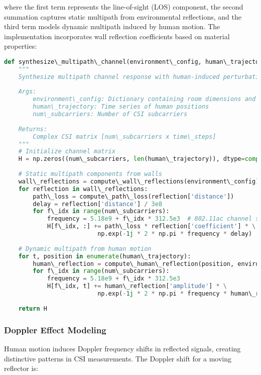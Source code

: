 \documentclass[journal]{IEEEtran}
\begin{document}
where the first term represents the line-of-sight (LOS) component, the second summation captures static multipath from environmental reflections, and the third term models dynamic multipath induced by human motion. The implementation incorporates wall reflection coefficients based on material properties:

\begin{lstlisting}[language=Python, caption=Multipath Channel Synthesis]
def synthesize\_multipath\_channel(environment\_config, human\_trajectory, num\_subcarriers=114):
    """
    Synthesize multipath channel response with human-induced perturbations
    
    Args:
        environment\_config: Dictionary containing room dimensions and materials
        human\_trajectory: Time series of human positions
        num\_subcarriers: Number of CSI subcarriers
    
    Returns:
        Complex CSI matrix [num\_subcarriers x time\_steps]
    """
    # Initialize channel matrix
    H = np.zeros((num\_subcarriers, len(human\_trajectory)), dtype=complex)
    
    # Static multipath components from walls
    wall\_reflections = compute\_wall\_reflections(environment\_config)
    for reflection in wall\_reflections:
        path\_loss = compute\_path\_loss(reflection['distance'])
        delay = reflection['distance'] / 3e8
        for f\_idx in range(num\_subcarriers):
            frequency = 5.18e9 + f\_idx * 312.5e3  # 802.11ac channel spacing
            H[f\_idx, :] += path\_loss * reflection['coefficient'] * \
                          np.exp(-1j * 2 * np.pi * frequency * delay)
    
    # Dynamic multipath from human motion
    for t, position in enumerate(human\_trajectory):
        human\_reflection = compute\_human\_reflection(position, environment\_config)
        for f\_idx in range(num\_subcarriers):
            frequency = 5.18e9 + f\_idx * 312.5e3
            H[f\_idx, t] += human\_reflection['amplitude'] * \
                          np.exp(-1j * 2 * np.pi * frequency * human\_reflection['delay'])
    
    return H
\end{lstlisting}

\subsubsection{Doppler Effect Modeling}

Human motion induces Doppler frequency shifts in reflected signals, creating distinctive patterns in CSI measurements. The Doppler shift for a moving reflector is:
\end{document}

